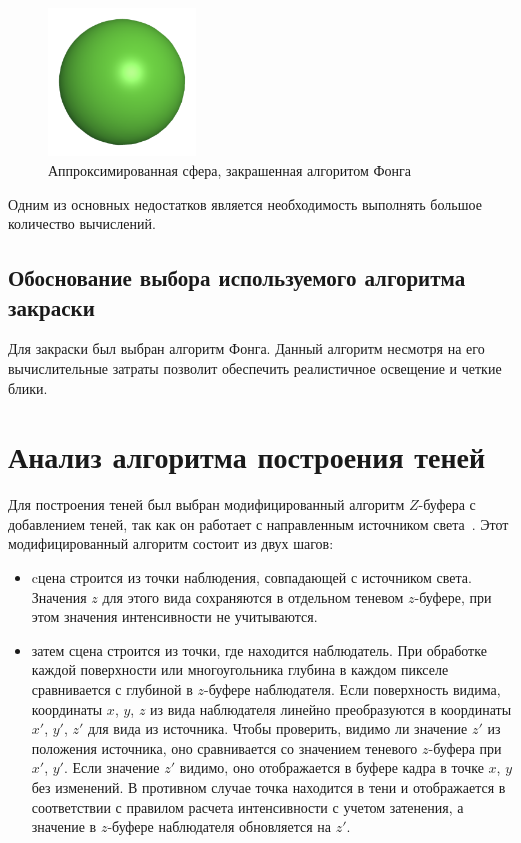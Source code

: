 \begin{figure}[h] 
	\centering
	\includegraphics[width=0.35\textwidth]{images/phong-shading.png}
	\caption{Аппроксимированная сфера, закрашенная алгоритом Фонга} 
	\label{fig:phong-shading} 
\end{figure}

Одним из основных недостатков является необходимость выполнять большое количество вычислений.

\subsection{Обоснование выбора используемого алгоритма закраски}

Для закраски был выбран алгоритм Фонга. Данный алгоритм несмотря на его вычислительные затраты позволит обеспечить реалистичное освещение и четкие блики.

\section{Анализ алгоритма построения теней}

Для построения теней был выбран модифицированный алгоритм $Z$-буфера с добавлением теней, так как он работает с направленным источником света~\cite{lit3, lit8}. Этот модифицированный алгоритм состоит из двух шагов:
\begin{itemize}[label=--]
	\item cцена строится из точки наблюдения, совпадающей с источником света. Значения $z$ для этого вида сохраняются в отдельном теневом $z$-буфере, при этом значения интенсивности не учитываются.
	\item затем сцена строится из точки, где находится наблюдатель. При обработке каждой поверхности или многоугольника глубина в каждом пикселе сравнивается с глубиной в $z$-буфере наблюдателя. Если поверхность видима, координаты $x$, $y$, $z$ из вида наблюдателя линейно преобразуются в координаты $x'$, $y'$, $z'$ для вида из источника. Чтобы проверить, видимо ли значение $z'$ из положения источника, оно сравнивается со значением теневого $z$-буфера при $x'$, $y'$. Если значение $z'$ видимо, оно отображается в буфере кадра в точке $x$, $y$ без изменений. В противном случае точка находится в тени и отображается в соответствии с правилом расчета интенсивности с учетом затенения, а значение в $z$-буфере наблюдателя обновляется на $z'$.
\end{itemize}


